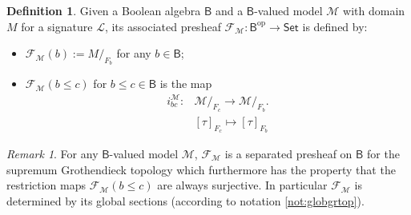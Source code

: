 \documentclass[11pt]{amsart}
\newcommand{\LL}{\mathcal{L}}
\newcommand{\F}{\mathcal{F}}
\theoremstyle{plain}
\theoremstyle{definition}
\newtheorem{definition}[theorem]{Definition}
\theoremstyle{plain}
\theoremstyle{remark}
\newtheorem{remark}[theorem]{Remark}
\newcommand{\M}{\mathcal{M}}
\newcommand{\dSet}{\mathsf{Set}}
\newcommand{\bool}[1]{\mathsf{#1}}
\newcommand{\0}{\mathsf{0}}
\renewcommand{\1}{\mathsf{1}}
\renewcommand{\2}{\mathsf{2}}
\theoremstyle{definition}
\begin{document}
\begin{definition}\label{def:preshbvm}
Given a Boolean algebra $\bool{B}$
and a $\bool{B}$-valued model $\M$ with domain $M$ for a signature $\LL$, its associated presheaf $\F_\M:\bool{B}^{\textrm{op}}\to\dSet$ is defined by:
\begin{itemize}
\item $\F_\M(b):=M/_{F_b}$ for any $b\in\bool{B}$;

\item $\F_\M(b\leq c)$ for $b\leq c\in\bool{B}$ is the map
\begin{align*}%
i^\M_{bc}:& \M/_{F_c}\to \M/_{F_b}.\\
& [\tau]_{F_c}\mapsto [\tau]_{F_b}
\end{align*}
\end{itemize}
\end{definition}

\begin{remark}
For any $\bool{B}$-valued model $\M$,
$\F_\M$ is a separated presheaf on  $\bool{B}$  for the supremum Grothendieck topology which furthermore has the property that the restriction maps $\F_\M(b\leq c)$ are always surjective. In particular $\F_\M$ is determined by its global sections (according to notation \ref{not:globgrtop}).
 \end{remark}
\end{document}
